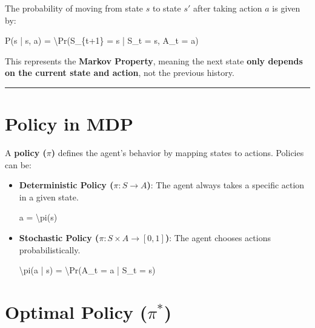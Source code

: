 \documentclass[
]{book}
\newenvironment{Shaded}{\begin{snugshade}}{\end{snugshade}}
\newcommand{\NormalTok}[1]{#1}
\begin{document}
The probability of moving from state \(s\) to state \(s'\) after taking action \(a\) is given by:

\begin{Shaded}
\begin{Highlighting}[]
\NormalTok{P(s\textquotesingle{} | s, a) = \textbackslash{}Pr(S\_\{t+1\} = s\textquotesingle{} | S\_t = s, A\_t = a)}
\end{Highlighting}
\end{Shaded}

This represents the \textbf{Markov Property}, meaning the next state \textbf{only depends on the current state and action}, not the previous history.

\begin{center}\rule{0.5\linewidth}{0.5pt}\end{center}

\section{\texorpdfstring{\textbf{Policy in MDP}}{Policy in MDP}}\label{policy-in-mdp}

A \textbf{policy (\(\pi\))} defines the agent's behavior by mapping states to actions. Policies can be:

\begin{itemize}
\item
  \textbf{Deterministic Policy (\(\pi: S \to A\))}: The agent always takes a specific action in a given state.

\begin{Shaded}
\begin{Highlighting}[]
\NormalTok{a = \textbackslash{}pi(s)}
\end{Highlighting}
\end{Shaded}
\item
  \textbf{Stochastic Policy (\(\pi: S \times A \to [0,1]\))}: The agent chooses actions probabilistically.

\begin{Shaded}
\begin{Highlighting}[]
\NormalTok{\textbackslash{}pi(a | s) = \textbackslash{}Pr(A\_t = a | S\_t = s)}
\end{Highlighting}
\end{Shaded}
\end{itemize}

\section{\texorpdfstring{\textbf{Optimal Policy (\(\pi^*\))}}{Optimal Policy (\textbackslash pi\^{}*)}}\label{optimal-policy-pi}
\end{document}
